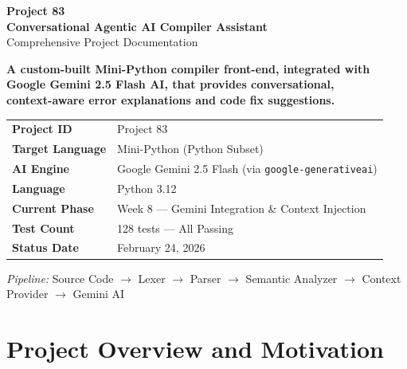 \documentclass[a4paper,11pt]{article}
\begin{document}

\begin{titlepage}
\centering
\vspace*{2cm}
{\Huge\bfseries\color{blue!70!black} Project 83}\\[6pt]
{\LARGE\bfseries Conversational Agentic AI Compiler Assistant}\\[10pt]
{\Large Comprehensive Project Documentation}\\[2cm]

\begin{tcolorbox}[colback=blue!5!white, colframe=blue!60!black, width=0.85\textwidth]
\centering
\textbf{A custom-built Mini-Python compiler front-end, integrated with\\
Google Gemini 2.5 Flash AI, that provides conversational,\\
context-aware error explanations and code fix suggestions.}
\end{tcolorbox}

\vspace{1.5cm}
\begin{tabular}{ll}
\toprule
\textbf{Project ID}     & Project 83 \\
\textbf{Target Language}& Mini-Python (Python Subset) \\
\textbf{AI Engine}      & Google Gemini 2.5 Flash (via \texttt{google-generativeai}) \\
\textbf{Language}       & Python 3.12 \\
\textbf{Current Phase}  & Week 8 --- Gemini Integration \& Context Injection \\
\textbf{Test Count}     & 128 tests --- All Passing \\
\textbf{Status Date}    & February 24, 2026 \\
\bottomrule
\end{tabular}

\vfill
{\large\textit{Pipeline:} Source Code $\rightarrow$ Lexer $\rightarrow$ Parser $\rightarrow$ Semantic Analyzer $\rightarrow$ Context Provider $\rightarrow$ Gemini AI}
\end{titlepage}

\tableofcontents
\newpage

\section{Project Overview and Motivation}
\end{document}

